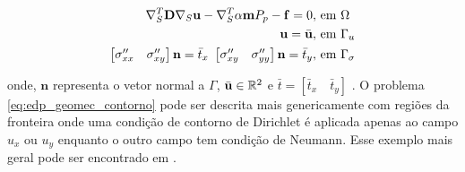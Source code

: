 \begin{equation} \label{eq:edp_geomec_contorno}
\begin{aligned}
     \nabla_S^T \mathbf{D} \nabla_S \mathbf{u} - \nabla_S^T\alpha \mathbf{m} P_p - \mathbf{f} = 0, & \text{ em }\Omega  \\
     \mathbf{u} = \bar{\mathbf{u}},& \text{ em } \Gamma_u \\
    \begin{bmatrix}
        \sigma_{xx}^{\prime\prime} & \sigma_{xy}^{\prime\prime}
    \end{bmatrix} \mathbf{n} = \bar{t}_x \text{   }     \begin{bmatrix}
        \sigma_{xy}^{\prime\prime} & \sigma_{yy}^{\prime\prime}
    \end{bmatrix} \mathbf{n} = \bar{t}_y, & \text{   em } \Gamma_{\sigma} 
\end{aligned}  
\end{equation}

onde, $\mathbf{n}$ representa o vetor normal a $\Gamma$,  $\bar{\mathbf{u}} \in \mathbb{R}^2$ e $\bar{t} = [ \bar{t}_x \quad \bar{t}_y ]$  . O problema \eqref{eq:edp_geomec_contorno} pode ser descrita mais genericamente com regiões da fronteira onde uma condição de contorno de Dirichlet é aplicada apenas ao campo $u_x$ ou $u_y$ enquanto o outro campo tem condição de Neumann. Esse exemplo mais geral pode ser encontrado em \citet{hughes}.
